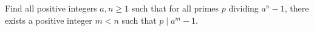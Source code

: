 Find all positive integers $a,n\ge1$ such that for all primes $p$ dividing $a^n-1$, there exists a positive integer $m<n$ such that $p\mid a^m-1$.